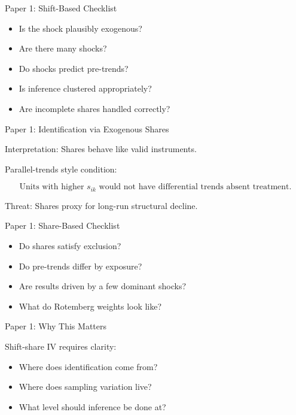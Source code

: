 \documentclass[aspectratio=169]{beamer}
\begin{document}
\begin{frame}{Paper 1: Shift-Based Checklist}

\begin{itemize}
    \item Is the shock plausibly exogenous?
    \item Are there many shocks?
    \item Do shocks predict pre-trends?
    \item Is inference clustered appropriately?
    \item Are incomplete shares handled correctly?
\end{itemize}

\end{frame}

\begin{frame}{Paper 1: Identification via Exogenous Shares}

Interpretation:
Shares behave like valid instruments.

Parallel-trends style condition:

\[
\text{Units with higher } s_{ik}
\text{ would not have differential trends absent treatment.}
\]

Threat:
Shares proxy for long-run structural decline.

\end{frame}

\begin{frame}{Paper 1: Share-Based Checklist}

\begin{itemize}
    \item Do shares satisfy exclusion?
    \item Do pre-trends differ by exposure?
    \item Are results driven by a few dominant shocks?
    \item What do Rotemberg weights look like?
\end{itemize}

\end{frame}

\begin{frame}{Paper 1: Why This Matters}

Shift-share IV requires clarity:

\begin{itemize}
    \item Where does identification come from?
    \item Where does sampling variation live?
    \item What level should inference be done at?
\end{itemize}

\end{frame}
\end{document}
